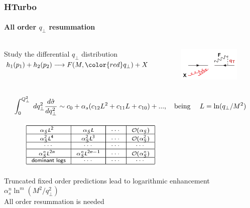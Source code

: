 \documentclass[aspectratio=43]{beamer}
\begin{document}
\begin{frame}


\end{frame}

\begin{frame}

	\frametitle{HTurbo}
	\framesubtitle{All order $q_{\perp}$ resummation}
	
	\begin{columns}
	
		
		\center	\footnotesize Study the differential $q_{\perp}$ distribution \\
		\center	$h_{1}(p_{1}) + h_{2}(p_{2}) \longrightarrow F(M, {\color{red}q_{\perp}}) + X$
	
		
		\begin{figure}
			\includegraphics[width = 3.5cm]{plots/qT_diagram.png}
		\end{figure}

	\end{columns}

	\footnotesize {$$\int_{0}^{Q_{\perp}^{2}} \; dq_{\perp}^{2} \frac{d\hat{\sigma}}{dq_{\perp}^{2}} \sim c_{0} + \alpha_{s}(c_{12}L^{2} + c_{11}L + c_{10}) + ..., \textrm{\quad being \quad} L = \ln (q_{\perp} / M^{2})$$}

	\begin{figure}
		\includegraphics[width = 7cm]{plots/qT_logs_table.png}
	\end{figure}

	\footnotesize Truncated fixed order predictions lead to {\color{red} logarithmic enhancement $\alpha_{s}^{n}\ln^{m}(M^{2}/q_{\perp}^{2})$} \\
	\center \footnotesize {\color{red} All order resummation is needed} \\

\end{frame}
\end{document}
